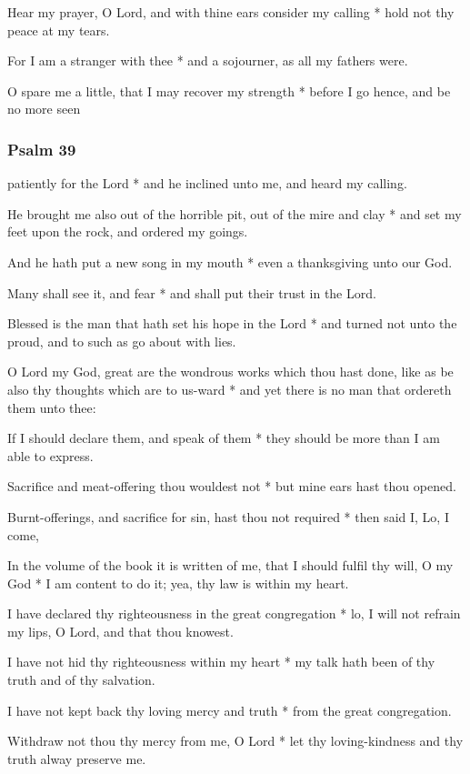 Hear my prayer, O Lord, and with thine ears consider my calling * hold not thy peace at my tears.

For I am a stranger with thee * and a sojourner, as all my fathers were.

O spare me a little, that I may recover my strength * before I go hence, and be no more seen

\subsubsection{Psalm 39}


 patiently for the Lord * and he inclined unto me, and heard my calling.

He brought me also out of the horrible pit, out of the mire and clay * and set my feet upon the rock, and ordered my goings.

And he hath put a new song in my mouth * even a thanksgiving unto our God.

Many shall see it, and fear * and shall put their trust in the Lord.

Blessed is the man that hath set his hope in the Lord * and turned not unto the proud, and to such as go about with lies.

O Lord my God, great are the wondrous works which thou hast done, like as be also thy thoughts which are to us-ward * and yet there is no man that ordereth them unto thee:

If I should declare them, and speak of them * they should be more than I am able to express.

Sacrifice and meat-offering thou wouldest not * but mine ears hast thou opened.

Burnt-offerings, and sacrifice for sin, hast thou not required * then said I, Lo, I come,

In the volume of the book it is written of me, that I should fulfil thy will, O my God * I am content to do it; yea, thy law is within my heart.

I have declared thy righteousness in the great congregation * lo, I will not refrain my lips, O Lord, and that thou knowest.

I have not hid thy righteousness within my heart * my talk hath been of thy truth and of thy salvation.

I have not kept back thy loving mercy and truth * from the great congregation.

Withdraw not thou thy mercy from me, O Lord * let thy loving-kindness and thy truth alway preserve me.

